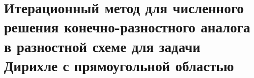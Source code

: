 \documentclass[__main__.tex]{subfiles}
\begin{document}
\section{Итерационный метод для численного решения конечно-разностного аналога в разностной схеме для задачи Дирихле с прямоугольной областью}
\end{document}
